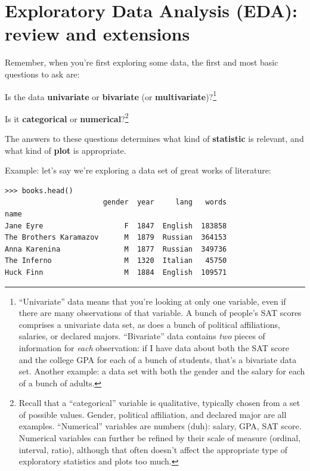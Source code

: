
\chapter{Exploratory Data Analysis (EDA): review and extensions}


Remember, when you're first exploring some data, the first and most basic
questions to ask are:

\begin{compactenum}

\item Is the data \textbf{univariate} or \textbf{bivariate} (or
\textbf{multivariate})?\footnote{``Univariate'' data means that you're looking
at only one variable, even if there are many observations of that variable. A
bunch of people's SAT scores comprises a univariate data set, as does a bunch
of political affiliations, salaries, or declared majors. ``Bivariate'' data
contains \textit{two} pieces of information for \textit{each} observation: if I
have data about both the SAT score and the college GPA for each of a bunch of
students, that's a bivariate data set. Another example: a data set with both
the gender and the salary for each of a bunch of adults.}

\item Is it \textbf{categorical} or \textbf{numerical}?\footnote{Recall that a
``categorical'' variable is qualitative, typically chosen from a set of
possible values. Gender, political affiliation, and declared major are all
examples. ``Numerical'' variables are numbers (duh): salary, GPA, SAT score.
Numerical variables can further be refined by their scale of measure (ordinal,
interval, ratio), although that often doesn't affect the appropriate type of
exploratory statistics and plots too much.}

\end{compactenum}

The answers to these questions determines what kind of \textbf{statistic} is
relevant, and what kind of \textbf{plot} is appropriate.

\bigskip
Example: let's say we're exploring a data set of great works of literature:

\begin{Verbatim}[fontsize=\normalsize,samepage=true,frame=single]
>>> books.head()
                       gender  year     lang   words
name                                                
Jane Eyre                   F  1847  English  183858
The Brothers Karamazov      M  1879  Russian  364153
Anna Karenina               M  1877  Russian  349736
The Inferno                 M  1320  Italian   45750
Huck Finn                   M  1884  English  109571
\end{Verbatim}

